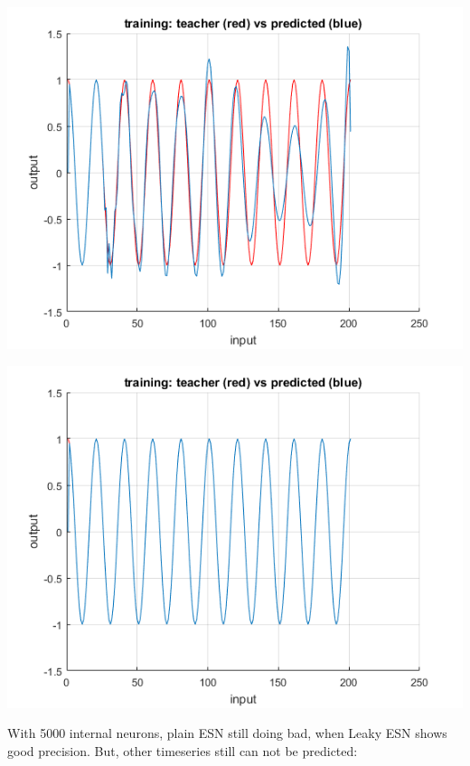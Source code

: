 \documentclass[a4paper, 12pt]{article}
\begin{document}
\begin{center}
\includegraphics[scale=0.6]{5000plain.png}

\includegraphics[scale=0.6]{5000leaky.png}
\end{center}

With 5000 internal neurons, plain ESN still doing bad, when Leaky ESN shows good precision. But, other timeseries still can not be predicted:
\end{document}
